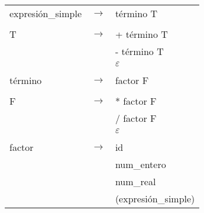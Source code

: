 \documentclass[11pt,twoside,a4paper]{book}
\begin{document}
\begin{tabular}{l c l}
expresi\'{o}n\_simple & $ \rightarrow $ & t\'{e}rmino T \\
\\

T &  $ \rightarrow $ & + t\'{e}rmino T \\
                  & & - t\'{e}rmino T \\
                  & &  $ \varepsilon $ \\
\\

t\'{e}rmino & $ \rightarrow $ & factor F \\
\\

F & $ \rightarrow $ & * factor F \\
                  & & / factor F \\
                  & & $ \varepsilon $ \\
\\

factor & $ \rightarrow $ & id \\
                    & & num\_entero \\
                    & & num\_real \\
                    & & (expresi\'{o}n\_simple)
\end{tabular}
\end{document}

